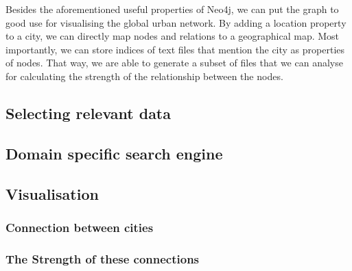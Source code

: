 Besides the aforementioned useful properties of Neo4j, we can put the graph to good use for visualising the global urban network. By adding a location property to a city, we can directly map nodes and relations to a geographical map. Most importantly, we can store indices of text files that mention the city as properties of nodes. That way, we are able to generate a subset of files that we can analyse for calculating the strength of the relationship between the nodes.

\subsection{Selecting relevant data}





\subsection{Domain specific search engine}


\subsection{Visualisation}

\subsubsection{Connection between cities}
\subsubsection{The Strength of these connections}